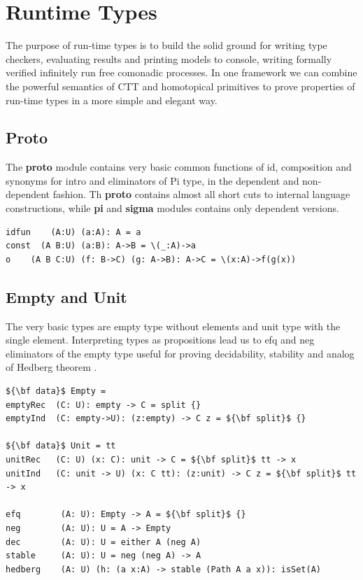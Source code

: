 \documentclass{article}
\begin{document}
\section{Runtime Types}

The purpose of run-time types is to build the solid ground for
writing type checkers, evaluating results and printing models to console,
writing formally verified infinitely run free comonadic processes.
In one framework we can combine the powerful semantics of CTT and
homotopical primitives to prove properties of run-time types in
a more simple and elegant way.

\subsection{Proto}

The {\bf proto} module contains very basic common functions of id, composition and
synonyms for intro and eliminators of Pi type, in the dependent and non-dependent fashion.
Th {\bf proto} contains almost all short cuts to internal language constructions,
while {\bf pi} and {\bf sigma} modules contains only dependent versions.

\begin{lstlisting}[mathescape=true]
idfun    (A:U) (a:A): A = a
const  (A B:U) (a:B): A->B = \(_:A)->a
o    (A B C:U) (f: B->C) (g: A->B): A->C = \(x:A)->f(g(x))
\end{lstlisting}

\subsection{Empty and Unit}

The very basic types are empty type without elements and unit type with the single element.
Interpreting types as propositions lead us to efq and neg eliminators of the empty type useful
for proving decidability, stability and analog of Hedberg theorem \cite{Hedberg98}.

\begin{lstlisting}[mathescape=true]
${\bf data}$ Empty =
emptyRec  (C: U): empty -> C = split {}
emptyInd  (C: empty->U): (z:empty) -> C z = ${\bf split}$ {}

${\bf data}$ Unit = tt
unitRec   (C: U) (x: C): unit -> C = ${\bf split}$ tt -> x
unitInd   (C: unit -> U) (x: C tt): (z:unit) -> C z = ${\bf split}$ tt -> x

efq        (A: U): Empty -> A = ${\bf split}$ {}
neg        (A: U): U = A -> Empty
dec        (A: U): U = either A (neg A)
stable     (A: U): U = neg (neg A) -> A
hedberg    (A: U) (h: (a x:A) -> stable (Path A a x)): isSet(A)
\end{lstlisting}
\end{document}
